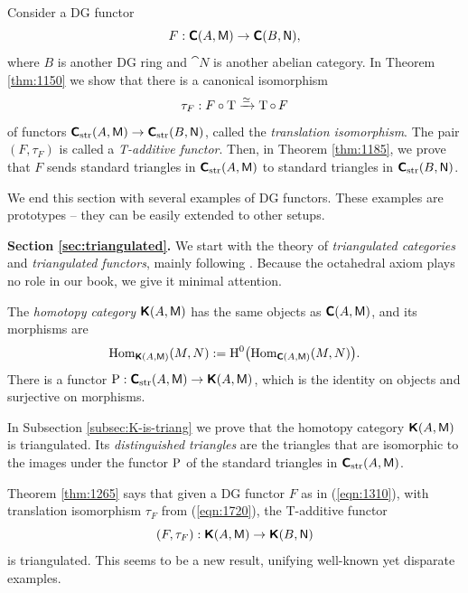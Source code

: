 Consider a DG functor
\begin{equation} \label{eqn:1310}
F : \boldsymbol{\mathsf{C}}(A, \operatorname{\mathsf{M}}) \to \boldsymbol{\mathsf{C}}(B, \operatorname{\mathsf{N}}) , 
\end{equation}
where $B$ is another DG ring and  $\cat{N}$ is another abelian 
category. In Theorem \ref{thm:1150} we show that there is a canonical 
isomorphism
\begin{equation} \label{eqn:1720}
\tau_F : F \circ \operatorname{T} \xrightarrow{\simeq} \operatorname{T} \circ \, F
\end{equation}
of functors 
$\boldsymbol{\mathsf{C}}_{\mathrm{str}}(A, \operatorname{\mathsf{M}}) \to \boldsymbol{\mathsf{C}}_{\mathrm{str}}(B, \operatorname{\mathsf{N}})$,
called the {\em translation isomorphism}. The pair 
$(F, \tau_F)$ is called a {\em T-additive functor}. 
Then, in Theorem \ref{thm:1185}, 
we prove that $F$ sends standard triangles in  
$\boldsymbol{\mathsf{C}}_{\mathrm{str}}(A, \operatorname{\mathsf{M}})$
to standard triangles in $\boldsymbol{\mathsf{C}}_{\mathrm{str}}(B, \operatorname{\mathsf{N}})$. 

We end this section with several examples of DG functors.
These examples are prototypes -- they can be easily extended to other setups. 
 

 \medskip \noindent 
{\bf Section \ref{sec:triangulated}.}
We start with the theory of {\em triangulated categories} and 
{\em triangulated functors}, mainly following \cite{RD}. Because the  
octahedral axiom plays no role in our book, we give it minimal attention. 

The {\em homotopy category} $\boldsymbol{\mathsf{K}}(A, \operatorname{\mathsf{M}})$ has the same objects as 
$\boldsymbol{\mathsf{C}}(A, \operatorname{\mathsf{M}})$, and its morphisms are 
\[ \operatorname{Hom}_{\boldsymbol{\mathsf{K}}(A, \operatorname{\mathsf{M}})} (M, N) := 
\operatorname{H}^0 \bigl( \operatorname{Hom}_{\boldsymbol{\mathsf{C}}(A, \operatorname{\mathsf{M}})} (M, N) \bigr) . \]
There is a functor 
$\operatorname{P} : \boldsymbol{\mathsf{C}}_{\mathrm{str}}(A, \operatorname{\mathsf{M}}) \to \boldsymbol{\mathsf{K}}(A, \operatorname{\mathsf{M}})$, 
which is the identity on objects and surjective on morphisms. 

In Subsection \ref{subsec:K-is-triang} we prove that the homotopy 
category $\boldsymbol{\mathsf{K}}(A, \operatorname{\mathsf{M}})$ is triangulated. Its {\em distinguished 
triangles} are the triangles that are isomorphic to the images under the 
functor $\operatorname{P}$ of the standard triangles in 
$\boldsymbol{\mathsf{C}}_{\mathrm{str}}(A, \operatorname{\mathsf{M}})$. 

Theorem \ref{thm:1265} says that given a DG 
functor $F$ as in (\ref{eqn:1310}), with translation isomorphism $\tau_F$
from (\ref{eqn:1720}), the T-additive functor 
\begin{equation} \label{eqn:5012}
(F, \tau_F) : \boldsymbol{\mathsf{K}}(A, \operatorname{\mathsf{M}}) \to \boldsymbol{\mathsf{K}}(B, \operatorname{\mathsf{N}})
\end{equation}
is triangulated. This seems to be a new result, unifying well-known yet 
disparate examples. 

